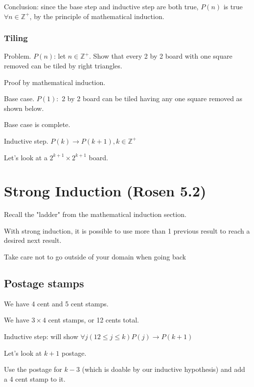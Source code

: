 \documentclass[english,openany]{book}
\begin{document}
    Conclusion: since the base step and inductive step are both true, $P(n)$ is true $\forall n \in \mathbb Z^+$, by the principle of mathematical induction.\\

    \subsubsection{Tiling}

    Problem. $P(n)$: let $n \in \mathbb Z^+$. Show that every 2 by 2 board with one square removed can be tiled by right triangles.

    Proof by mathematical induction.

    Base case. $P(1): $ 2 by 2 board can be tiled having any one square removed as shown below.


    Base case is complete.

    Inductive step. $P(k) \rightarrow P(k+1), k \in \mathbb Z^+$

    Let's look at a $2^{k+1} \times 2^{k+1}$ board.


    \section{Strong Induction (Rosen 5.2)}

    Recall the "ladder" from the mathematical induction section.

    With strong induction, it is possible to use more than 1 previous result to reach a desired next result.

    Take care not to go outside of your domain when going back

    \subsection{Postage stamps}


    We have 4 cent and 5 cent stamps.

    We have $3 \times 4$ cent stamps, or 12 cents total.

    Inductive step: will show $\forall j (12 \leq j \leq k) P(j) \rightarrow P(k+1)$

    Let's look at $k + 1$ postage.

    Use the postage for $k - 3$ (which is doable by our inductive hypothesis) and add a 4 cent stamp to it.
\end{document}
